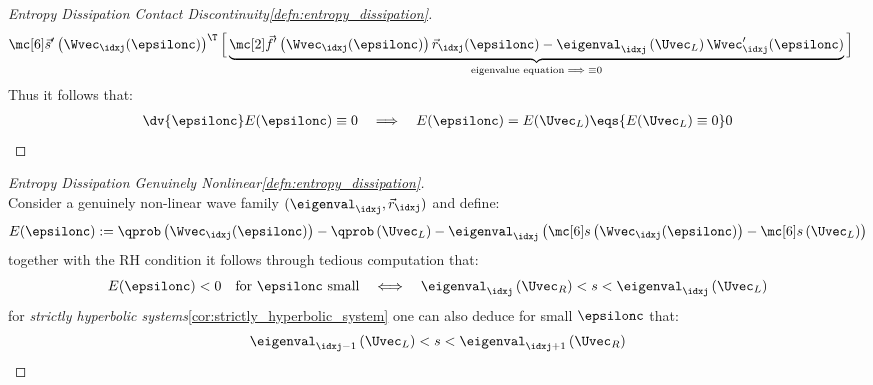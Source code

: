 \begin{proofbox}
\begin{proof}[\newline Entropy Dissipation Contact Discontinuity\cref{defn:entropy_dissipation}]
\begin{align*}
        &\entropyvec'\left(\Wvec_{\idxj}(\epsilonc)\right)^{\T}
            \Big[\underbrace{\fluxvec'\left(\Wvec_{\idxj}(\epsilonc)\right)\vec{r}_{\idxj}(\epsilonc)
             -\eigenval_{\idxj}\left(\Uvec_{L}\right)\Wvec_{\idxj}'(\epsilonc)}_{\text{eigenvalue equation}\implies\equiv0}\Big]
        \end{align*}
        Thus it follows that:
        \begin{align}
          \dv{\epsilonc}E(\epsilonc)\equiv0&&\implies&&E(\epsilonc)=E(\Uvec_{L})\eqs{E(\Uvec_{L})\equiv0}0
        \end{align}
    \end{proof}
\end{proofbox}
\begin{proofbox}\nospacing
    \begin{proof}[\newline Entropy Dissipation Genuinely Nonlinear\cref{defn:entropy_dissipation}]\label{proof:defn:entropy_dissipation_gnl}\leavevmode\\
        Consider a genuinely non-linear wave family $(\eigenval_{\idxj},\vec{r}_{\idxj})$ and define:
        \begin{align*}
          E(\epsilonc):=\qprob \left(\Wvec_{\idxj}(\epsilonc)\right)-\qprob \left(\Uvec_{L}\right)-\eigenval_{\idxj}\left(\entropy\left(\Wvec_{\idxj}(\epsilonc)\right)-\entropy\left(\Uvec_{L}\right)\right)
        \end{align*}
        together with the RH condition it follows through tedious computation that:
        \begin{align*}
          E(\epsilonc)<0&&\text{for $\epsilonc$ small}&&\iff&&\eigenval_{\idxj}\left(\Uvec_{R}\right)<s<\eigenval_{\idxj}\left(\Uvec_{L}\right)
        \end{align*}
        for \textit{strictly hyperbolic systems}\cref{cor:strictly_hyperbolic_system} one can also deduce for small $\epsilonc$ that:
        \begin{align}
          \eigenval_{\idxj-1}\left(\Uvec_{L}\right)<s<\eigenval_{\idxj+1}\left(\Uvec_{R}\right)
        \end{align}
    \end{proof}
\end{proofbox}
